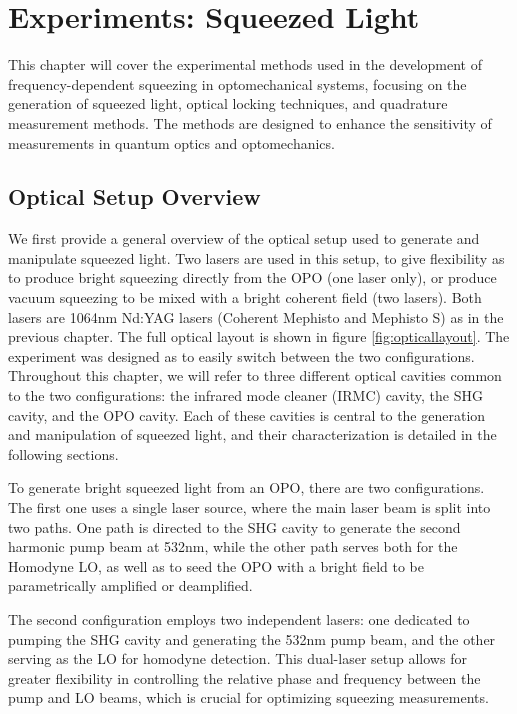 \chapter{Experiments: Squeezed Light}
This chapter will cover the experimental methods used in the development of frequency-dependent squeezing in optomechanical systems, focusing on the generation of squeezed light, optical locking techniques, and quadrature measurement methods. The methods are designed to enhance the sensitivity of measurements in quantum optics and optomechanics.
\minitoc
\newpage 

\section{Optical Setup Overview}

We first provide a general overview of the optical setup used to generate and manipulate squeezed light. 
Two lasers are used in this setup, to give flexibility as to produce bright squeezing directly from the OPO (one laser only), or produce vacuum squeezing to be mixed with a bright coherent field (two lasers). Both lasers are 1064nm Nd:YAG lasers (Coherent Mephisto and Mephisto S) as in the previous chapter. The full optical layout is shown in figure \ref{fig:opticallayout}. The experiment was designed as to easily switch between the two configurations. Throughout this chapter, we will refer to three different optical cavities common to the two configurations: the infrared mode cleaner (IRMC) cavity, the SHG cavity, and the OPO cavity. Each of these cavities is central to the generation and manipulation of squeezed light, and their characterization is detailed in the following sections. 

To generate bright squeezed light from an OPO, there are two configurations. The first one uses a single laser source, where the main laser beam is split into two paths. One path is directed to the SHG cavity to generate the second harmonic pump beam at 532nm, while the other path serves both for the Homodyne LO, as well as to seed the OPO with a bright field to be parametrically amplified or deamplified. 

The second configuration employs two independent lasers: one dedicated to pumping the SHG cavity and generating the 532nm pump beam, and the other serving as the LO for homodyne detection. This dual-laser setup allows for greater flexibility in controlling the relative phase and frequency between the pump and LO beams, which is crucial for optimizing squeezing measurements.


